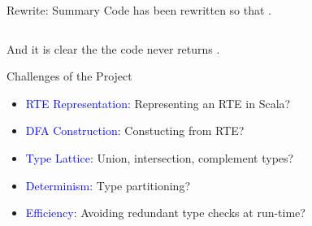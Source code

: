 \begin{frame}{Rewrite: Summary}
  Code has been rewritten so that .

  \begin{columns}
    \begin{column}{0.5\textwidth}
      \usebox\typecaseAbox
    \end{column}
    \begin{column}{0.5\textwidth}  %
      \usebox\typecaseKbox
    \end{column}
  \end{columns}

  And it is clear the the code never returns .

\end{frame}


{  %
\begin{frame}{Challenges of the Project}
  \begin{itemize}
  \item {}\textcolor{blue}{RTE Representation}:   Representing an RTE in Scala?
  \item {}\textcolor{blue}{DFA Construction}:  Constucting from RTE?
  \item {}\textcolor{blue}{Type Lattice}: Union, intersection, complement types?
  \item {}\textcolor{blue}{Determinism}: Type partitioning?
  \item {}\textcolor{blue}{Efficiency}:  Avoiding redundant type checks at run-time?
  \end{itemize}
\end{frame}
}




